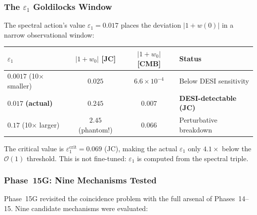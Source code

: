 \subsubsection{The $\varepsilon_1$ Goldilocks Window}

The spectral action's value $\varepsilon_1 = 0.017$ places the deviation $|1+w(0)|$ in a narrow observational window:

\begin{center}
\small
\begin{tabular}{l c c l}
\hline
$\varepsilon_1$ & $|1+w_0|$ [JC] & $|1+w_0|$ [CMB] & Status \\
\hline
$0.0017$ (10$\times$ smaller) & $0.025$ & $6.6 \times 10^{-4}$ & Below DESI sensitivity \\
$\mathbf{0.017}$ \textbf{(actual)} & $\mathbf{0.245}$ & $\mathbf{0.007}$ & \textbf{DESI-detectable (JC)} \\
$0.17$ (10$\times$ larger) & $2.45$ (phantom!) & $0.066$ & Perturbative breakdown \\
\hline
\end{tabular}
\end{center}

\noindent
The critical value is $\varepsilon_1^{\mathrm{crit}} = 0.069$ (JC), making the actual $\varepsilon_1$ only $4.1\times$ below the $\mathcal{O}(1)$ threshold. This is not fine-tuned: $\varepsilon_1$ is computed from the spectral triple.

\subsubsection{Phase~15G: Nine Mechanisms Tested}

Phase~15G revisited the coincidence problem with the full arsenal of Phases~14--15. Nine candidate mechanisms were evaluated:


